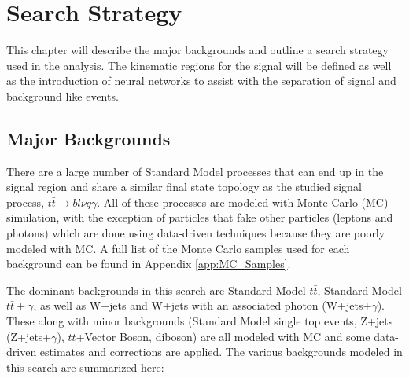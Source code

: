 
\chapter{Search Strategy}
\label{ch:SearchStrategy}
This chapter will describe the major backgrounds and outline a search strategy used in the analysis.  The kinematic regions for the signal will be defined as well as the introduction of neural networks to assist with the separation of signal and background like events.


\section{Major Backgrounds}
There are a large number of Standard Model processes that can end up in the signal region and share a similar final state topology as the studied signal process, $t\bar{t}\rightarrow b l \nu q \gamma$.  All of these processes are modeled with Monte Carlo (MC) simulation, with the exception of particles that fake other particles (leptons and photons) which are done using data-driven techniques because they are poorly modeled with MC.  A full list of the Monte Carlo samples used for each background can be found in Appendix \ref{app:MC_Samples}. 

The dominant backgrounds in this search are Standard Model $t\bar{t}$, Standard Model $t\bar{t}+\gamma$, as well as W+jets and W+jets with an associated photon (W+jets+$\gamma$).  These along with minor backgrounds (Standard Model single top events, Z+jets (Z+jets+$\gamma$), $t\bar{t}$+Vector Boson, diboson) are all modeled with MC and some data-driven estimates and corrections are applied.  The various backgrounds modeled in this search are summarized here:

